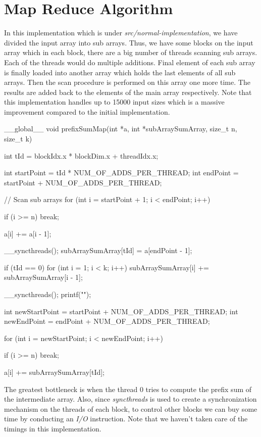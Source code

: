\documentclass[12pt]{article}
\numberwithin{equation}{section}
\numberwithin{table}{section}
\numberwithin{figure}{section}
\begin{document}
\section{Map Reduce Algorithm}
In this implementation which is under \textit{src/normal-implementation}, we have divided the input array into sub arrays. Thus, we have some blocks on the input array which in each block, there are a big number of threads scanning sub arrays. Each of the threads would do multiple additions. Final element of each sub array is finally loaded into another array which holds the last elements of all sub arrays. Then the scan procedure is performed on this array one more time. The results are added back to the elements of the main array respectively.
Note that this implementation handles up to 15000 input sizes which is a massive improvement compared to the initial implementation.
\begin{cpp}
	__global__ void
	prefixSumMap(int *a, int *subArraySumArray, size_t n, size_t k)
	{
		int tId = blockIdx.x * blockDim.x + threadIdx.x;
		
		int startPoint = tId * NUM_OF_ADDS_PER_THREAD;
		int endPoint = startPoint + NUM_OF_ADDS_PER_THREAD;
		
		// Scan sub arrays
		for (int i = startPoint + 1; i < endPoint; i++) {
			
			if (i >= n)
			break;
			
			a[i] += a[i - 1];
		}
		
		__syncthreads();
		subArraySumArray[tId] = a[endPoint - 1];
		
		if (tId == 0) {
			for (int i = 1; i < k; i++) {
				subArraySumArray[i] += subArraySumArray[i - 1];
			}
		}
		
		__syncthreads();
		printf("");
		
		int newStartPoint = startPoint + NUM_OF_ADDS_PER_THREAD;
		int newEndPoint = endPoint + NUM_OF_ADDS_PER_THREAD;
		
		for (int i = newStartPoint; i < newEndPoint; i++) {
			if (i >= n)
			break;
			
			a[i] += subArraySumArray[tId];
		}
	}
\end{cpp}
The greatest bottleneck is when the thread 0 tries to compute the prefix sum of the intermediate array. Also, since \textit{syncthreads} is used to create a synchronization mechanism on the threads of each block, to control other blocks we can buy some time by conducting an \textit{I/O} instruction. Note that we haven't taken care of the timings in this implementation.
\end{document}
